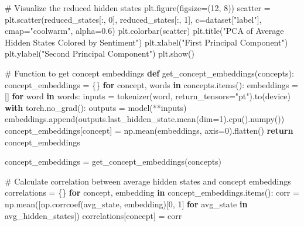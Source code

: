 \documentclass[
  letterpaper,
  DIV=11,
  numbers=noendperiod]{scrreprt}
\newenvironment{Shaded}{\begin{snugshade}}{\end{snugshade}}
\newcommand{\CommentTok}[1]{\textcolor[rgb]{0.37,0.37,0.37}{#1}}
\newcommand{\ControlFlowTok}[1]{\textcolor[rgb]{0.00,0.23,0.31}{\textbf{#1}}}
\newcommand{\DecValTok}[1]{\textcolor[rgb]{0.68,0.00,0.00}{#1}}
\newcommand{\FloatTok}[1]{\textcolor[rgb]{0.68,0.00,0.00}{#1}}
\newcommand{\KeywordTok}[1]{\textcolor[rgb]{0.00,0.23,0.31}{\textbf{#1}}}
\newcommand{\NormalTok}[1]{\textcolor[rgb]{0.00,0.23,0.31}{#1}}
\newcommand{\OperatorTok}[1]{\textcolor[rgb]{0.37,0.37,0.37}{#1}}
\newcommand{\StringTok}[1]{\textcolor[rgb]{0.13,0.47,0.30}{#1}}
\begin{document}
\begin{Shaded}
\begin{Highlighting}[]
\CommentTok{\# Visualize the reduced hidden states}
\NormalTok{plt.figure(figsize}\OperatorTok{=}\NormalTok{(}\DecValTok{12}\NormalTok{, }\DecValTok{8}\NormalTok{))}
\NormalTok{scatter }\OperatorTok{=}\NormalTok{ plt.scatter(reduced\_states[:, }\DecValTok{0}\NormalTok{], reduced\_states[:, }\DecValTok{1}\NormalTok{], c}\OperatorTok{=}\NormalTok{dataset[}\StringTok{"label"}\NormalTok{], cmap}\OperatorTok{=}\StringTok{"coolwarm"}\NormalTok{, alpha}\OperatorTok{=}\FloatTok{0.6}\NormalTok{)}
\NormalTok{plt.colorbar(scatter)}
\NormalTok{plt.title(}\StringTok{"PCA of Average Hidden States Colored by Sentiment"}\NormalTok{)}
\NormalTok{plt.xlabel(}\StringTok{"First Principal Component"}\NormalTok{)}
\NormalTok{plt.ylabel(}\StringTok{"Second Principal Component"}\NormalTok{)}
\NormalTok{plt.show()}

\CommentTok{\# Function to get concept embeddings}
\KeywordTok{def}\NormalTok{ get\_concept\_embeddings(concepts):}
\NormalTok{    concept\_embeddings }\OperatorTok{=}\NormalTok{ \{\}}
    \ControlFlowTok{for}\NormalTok{ concept, words }\KeywordTok{in}\NormalTok{ concepts.items():}
\NormalTok{        embeddings }\OperatorTok{=}\NormalTok{ []}
        \ControlFlowTok{for}\NormalTok{ word }\KeywordTok{in}\NormalTok{ words:}
\NormalTok{            inputs }\OperatorTok{=}\NormalTok{ tokenizer(word, return\_tensors}\OperatorTok{=}\StringTok{"pt"}\NormalTok{).to(device)}
            \ControlFlowTok{with}\NormalTok{ torch.no\_grad():}
\NormalTok{                outputs }\OperatorTok{=}\NormalTok{ model(}\OperatorTok{**}\NormalTok{inputs)}
\NormalTok{            embeddings.append(outputs.last\_hidden\_state.mean(dim}\OperatorTok{=}\DecValTok{1}\NormalTok{).cpu().numpy())}
\NormalTok{        concept\_embeddings[concept] }\OperatorTok{=}\NormalTok{ np.mean(embeddings, axis}\OperatorTok{=}\DecValTok{0}\NormalTok{).flatten()}
    \ControlFlowTok{return}\NormalTok{ concept\_embeddings}

\NormalTok{concept\_embeddings }\OperatorTok{=}\NormalTok{ get\_concept\_embeddings(concepts)}

\CommentTok{\# Calculate correlation between average hidden states and concept embeddings}
\NormalTok{correlations }\OperatorTok{=}\NormalTok{ \{\}}
\ControlFlowTok{for}\NormalTok{ concept, embedding }\KeywordTok{in}\NormalTok{ concept\_embeddings.items():}
\NormalTok{    corr }\OperatorTok{=}\NormalTok{ np.mean([np.corrcoef(avg\_state, embedding)[}\DecValTok{0}\NormalTok{, }\DecValTok{1}\NormalTok{] }\ControlFlowTok{for}\NormalTok{ avg\_state }\KeywordTok{in}\NormalTok{ avg\_hidden\_states])}
\NormalTok{    correlations[concept] }\OperatorTok{=}\NormalTok{ corr}


\end{Highlighting}
\end{Shaded}
\end{document}
